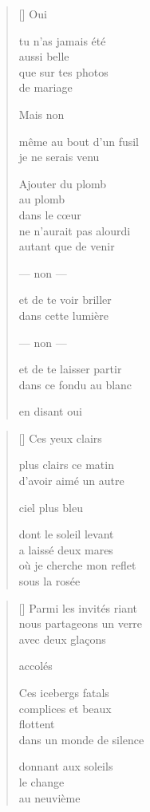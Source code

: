 \documentclass[11pt,a4paper]{book}
\begin{document}
\begin{verse}[\versewidth]
  Oui

  tu n'as jamais été \\
  aussi belle \\
  que sur tes photos \\
  de mariage

  Mais non

  même au bout d'un fusil \\
  je ne serais venu

  Ajouter du plomb \\
  au plomb \\
  dans le cœur \\
  ne n'aurait pas alourdi \\
  autant que de venir

  --- non ---

  et de te voir briller \\
  dans cette lumière

  --- non ---

  et de te laisser partir \\
  dans ce fondu au blanc

  en disant oui
\end{verse}

\newpage


\settowidth{\versewidth}{où je cherche mon reflet}

\bigskip

\begin{verse}[\versewidth]
  Ces yeux clairs

  plus clairs ce matin \\
  d'avoir aimé un autre

  ciel plus bleu

  dont le soleil levant \\
  a laissé deux mares \\
  où je cherche mon reflet \\
  sous la rosée
\end{verse}

\newpage


\settowidth{\versewidth}{Ils ne sont pas différents}

\bigskip

\begin{verse}[\versewidth]
  Parmi les invités riant \\
  nous partageons un verre \\
  avec deux glaçons

  accolés

  Ces icebergs fatals \\
  complices et beaux \\
  flottent \\
  dans un monde de silence

  donnant aux soleils \\
  le change \\
  au neuvième
\end{verse}
\end{document}
